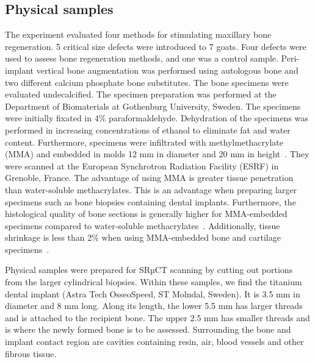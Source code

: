 \subsection{Physical samples}

The experiment evaluated four methods for stimulating maxillary bone
regeneration. 5 critical size defects were introduced to 7 goats. Four defects
were used to assess bone regeneration methods, and one was a control sample.
Peri-implant vertical bone augmentation was performed using autologous bone and
two different calcium phosphate bone substitutes. The bone specimens were
evaluated undecalcified. The specimen preparation was performed at the
Department of Biomaterials at Gothenburg University, Sweden. The specimens were
initially fixated in 4\% paraformaldehyde. Dehydration of the specimens was
performed in increasing concentrations of ethanol to eliminate fat and water
content. Furthermore, specimens were infiltrated with methylmethacrylate (MMA)
and embedded in molds 12 mm in diameter and 20 mm in
height~\cite{NELDAM2015682}. They were scanned at the European Synchrotron
Radiation Facility (ESRF) in Grenoble, France. The advantage of using MMA is
greater tissue penetration than water-soluble methacrylates. This is an
advantage when preparing larger specimens such as bone biopsies containing
dental implants. Furthermore, the histological quality of bone sections is
generally higher for MMA-embedded specimens compared to water-soluble
methacrylates~\cite{erben1997}. Additionally, tissue shrinkage is less than 2\%
when using MMA-embedded bone and cartilage specimens~\cite{ferguson1999}.

Physical samples were prepared for SRµCT scanning by cutting out portions from
the larger cylindrical biopsies. Within these samples, we find the titanium
dental implant (Astra Tech OsseoSpeed, ST Molndal, Sweden).  It is 3.5 mm in
diameter and 8 mm long. Along its length, the lower 5.5 mm has larger threads and
is attached to the recipient bone. The upper 2.5 mm has smaller threads and is
where the newly formed bone is to be assessed. Surrounding the bone and implant
contact region are cavities containing resin, air, blood vessels and other
fibrous tissue.

